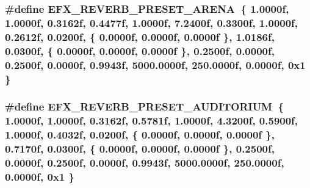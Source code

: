 \subsubsection[{\texorpdfstring{E\+F\+X\+\_\+\+R\+E\+V\+E\+R\+B\+\_\+\+P\+R\+E\+S\+E\+T\+\_\+\+A\+R\+E\+NA}{EFX_REVERB_PRESET_ARENA}}]{\setlength{\rightskip}{0pt plus 5cm}\#define E\+F\+X\+\_\+\+R\+E\+V\+E\+R\+B\+\_\+\+P\+R\+E\+S\+E\+T\+\_\+\+A\+R\+E\+NA~\{ 1.\+0000f, 1.\+0000f, 0.\+3162f, 0.\+4477f, 1.\+0000f, 7.\+2400f, 0.\+3300f, 1.\+0000f, 0.\+2612f, 0.\+0200f, \{ 0.\+0000f, 0.\+0000f, 0.\+0000f \}, 1.\+0186f, 0.\+0300f, \{ 0.\+0000f, 0.\+0000f, 0.\+0000f \}, 0.\+2500f, 0.\+0000f, 0.\+2500f, 0.\+0000f, 0.\+9943f, 5000.\+0000f, 250.\+0000f, 0.\+0000f, 0x1 \}}\hypertarget{efx-presets_8h_a80a8de17793714c91369357ba370843d}{}\label{efx-presets_8h_a80a8de17793714c91369357ba370843d}
\subsubsection[{\texorpdfstring{E\+F\+X\+\_\+\+R\+E\+V\+E\+R\+B\+\_\+\+P\+R\+E\+S\+E\+T\+\_\+\+A\+U\+D\+I\+T\+O\+R\+I\+UM}{EFX_REVERB_PRESET_AUDITORIUM}}]{\setlength{\rightskip}{0pt plus 5cm}\#define E\+F\+X\+\_\+\+R\+E\+V\+E\+R\+B\+\_\+\+P\+R\+E\+S\+E\+T\+\_\+\+A\+U\+D\+I\+T\+O\+R\+I\+UM~\{ 1.\+0000f, 1.\+0000f, 0.\+3162f, 0.\+5781f, 1.\+0000f, 4.\+3200f, 0.\+5900f, 1.\+0000f, 0.\+4032f, 0.\+0200f, \{ 0.\+0000f, 0.\+0000f, 0.\+0000f \}, 0.\+7170f, 0.\+0300f, \{ 0.\+0000f, 0.\+0000f, 0.\+0000f \}, 0.\+2500f, 0.\+0000f, 0.\+2500f, 0.\+0000f, 0.\+9943f, 5000.\+0000f, 250.\+0000f, 0.\+0000f, 0x1 \}}\hypertarget{efx-presets_8h_a1868444b35b1d09cc8438f66cb4ce7a8}{}\label{efx-presets_8h_a1868444b35b1d09cc8438f66cb4ce7a8}
